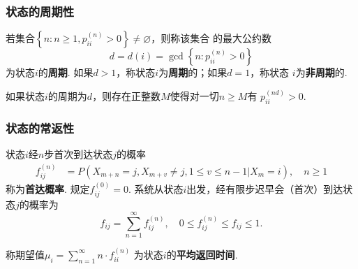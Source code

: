 \begin{frame}
    \frametitle{状态的周期性}
    \begin{mydefinition}[状态的周期性]
        若集合$\left\{n:n\geqslant 1,p_{ii}^{(n)}>0\right\}\neq\varnothing$，则称该集合
        的最大公约数
        \begin{equation}
            d=d(i)=\gcd\left\{n:p_{ii}^{(n)}>0\right\}
        \end{equation}
        为状态$i$的\textbf{周期}.
        如果$d>1$，称状态$i$为\textbf{周期}的；如果$d=1$，称状态
        $i$为\textbf{非周期}的.
    \end{mydefinition}
    \begin{mytheorem}
        如果状态$i$的周期为$d$，则存在正整数$M$使得对一切$n\geqslant M$有
        $p_{ii}^{(nd)}>0$. 
    \end{mytheorem}
\end{frame}

\begin{frame}
    \frametitle{状态的常返性}
    \begin{mydefinition}[首达概率]
        状态$i$经$n$步首次到达状态$j$的概率
        \begin{align*}
            f_{ij}^{(n)}&=P(X_{m+n}=j,X_{m+v}\neq j,1\leqslant v\leqslant n-1|X_m=i),\quad n\geqslant 1
        \end{align*}
        称为\textbf{首达概率}. 规定$f_{ij}^{(0)}=0$. 
        系统从状态$i$出发，经有限步迟早会（首次）到达状态$j$的概率为
        \begin{equation*}
            f_{ij}=\sum_{n=1}^\infty f_{ij}^{(n)},\quad 0\leqslant f_{ij}^{(n)}\leqslant f_{ij}\leqslant 1.
        \end{equation*}
    \end{mydefinition}
    \begin{mydefinition}[平均返回时间]
        称期望值$\displaystyle\mu_i=\sum_{n=1}^\infty n\cdot f_{ii}^{(n)}$
        为状态$i$的\textbf{平均返回时间}. 
    \end{mydefinition}
\end{frame}

